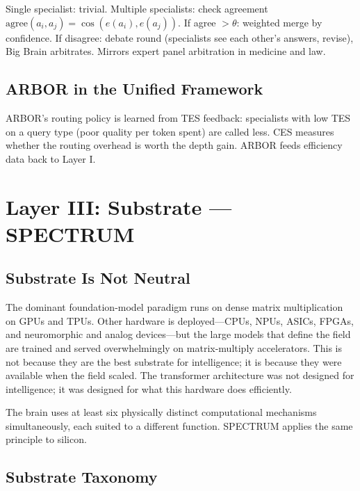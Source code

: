 \documentclass[12pt]{article}
\begin{document}
Single specialist: trivial. Multiple specialists: check agreement $\text{agree}(a_i, a_j) = \cos(e(a_i), e(a_j))$. If agree $> \theta$: weighted merge by confidence. If disagree: debate round (specialists see each other's answers, revise), Big Brain arbitrates. Mirrors expert panel arbitration in medicine and law.

\subsection{ARBOR in the Unified Framework}

ARBOR's routing policy is learned from TES feedback: specialists with low TES on a query type (poor quality per token spent) are called less. CES measures whether the routing overhead is worth the depth gain. ARBOR feeds efficiency data back to Layer I.

\section{Layer III: Substrate --- SPECTRUM}
\label{sec:spectrum}

\subsection{Substrate Is Not Neutral}

The dominant foundation-model paradigm runs on dense matrix multiplication on GPUs and TPUs. Other hardware is deployed---CPUs, NPUs, ASICs, FPGAs, and neuromorphic and analog devices---but the large models that define the field are trained and served overwhelmingly on matrix-multiply accelerators. This is not because they are the best substrate for intelligence; it is because they were available when the field scaled. The transformer architecture was not designed for intelligence; it was designed for what this hardware does efficiently.

The brain uses at least six physically distinct computational mechanisms simultaneously, each suited to a different function. SPECTRUM applies the same principle to silicon.

\subsection{Substrate Taxonomy}
\end{document}
